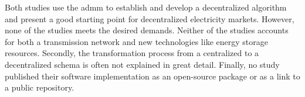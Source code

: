 Both studies use the \gls{admm} to establish and develop a decentralized algorithm and present a good starting point for decentralized electricity markets. However, none of the studies meets the desired demands. Neither of the studies accounts for both a transmission network and new technologies like energy storage resources. Secondly, the transformation process from a centralized to a decentralized schema is often not explained in great detail. Finally, no study published their software implementation as an open-source package or as a link to a public repository. 

